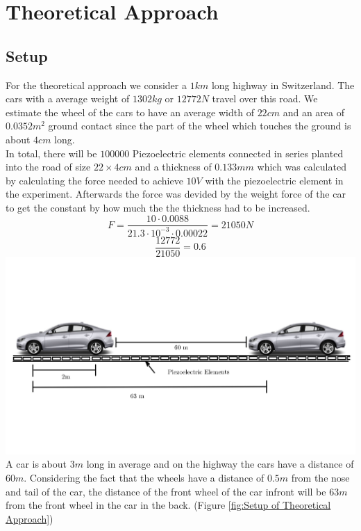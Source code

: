 \chapter{Theoretical Approach}

\section{Setup}

For the theoretical approach we consider a $1km$ long highway in Switzerland. The cars with a average weight of $1302 kg $ or $12772 N$ travel over this road. We estimate the wheel of the cars to have an average width of $22cm$ and an area of $0.0352m^2$ ground contact since the part of the wheel which touches the ground is about $4cm$ long.\cite{Kim2023}\\
In total, there will be $100000$ Piezoelectric elements connected in series planted into the road of size $22 \times 4 cm$ and a thickness of $0.133mm$ which was calculated by calculating the force needed to achieve $10 V$ with the piezoelectric element in the experiment. Afterwards the force was devided by the weight force of the car to get the constant by how much the the thickness had to be increased.
$$
F = \frac{10 \cdot 0.0088}{21.3 \cdot 10^{-3} \cdot 0.00022} = 21050 N
$$
$$
\frac{12772}{21050} = 0.6
$$
\includegraphics[width=\textwidth]{Figure_13.jpg}
\label{fig:Setup of Theoretical Approach}
\vspace{0.5cm}
A car is about $3m$ long in average and on the highway the cars have a distance of $60m$. Considering the fact that the wheels have a distance of $0.5m$ from the nose and tail of the car, the distance of the front wheel of the car infront will be $63m$ from the front wheel in the car in the back. (Figure \ref{fig:Setup of Theoretical Approach})\\

